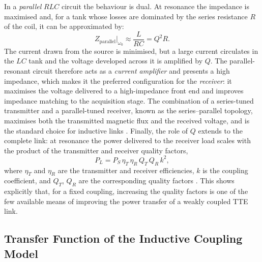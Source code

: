 In a \emph{parallel} $RLC$ circuit the behaviour is dual. At resonance the
impedance is maximised and, for a tank whose losses are dominated by the series
resistance $R$ of the coil, it can be approximated by:
\begin{equation}
    Z_{\text{parallel}}\big|_{\omega_0} \approx \frac{L}{RC} = Q^2 R.
    \label{eq:z_parallel_res}
\end{equation}
The current drawn from the source is minimised, but a large current circulates in
the $LC$ tank and the voltage developed across it is amplified by $Q$. The
parallel-resonant circuit therefore acts as a \emph{current amplifier} and
presents a high impedance, which makes it the preferred configuration for the
\emph{receiver}: it maximises the voltage delivered to a high-impedance front end
and improves impedance matching to the acquisition stage.
\newp
The combination of a series-tuned transmitter and a parallel-tuned receiver, known
as the series--parallel topology, maximises both the transmitted magnetic flux and
the received voltage, and is the standard choice for inductive
links \cite{agbinya2022principles}. Finally, the role of $Q$ extends to the complete link:
at resonance the power delivered to the receiver load scales with the product of
the transmitter and receiver quality factors,
\begin{equation}
    P_L = P_S\,\eta_T\,\eta_R\,Q_T\,Q_R\,k^2,
    \label{eq:power_q}
\end{equation}
where $\eta_T$ and $\eta_R$ are the transmitter and receiver efficiencies, $k$ is
the coupling coefficient, and $Q_T$, $Q_R$ are the corresponding quality
factors \cite{agbinya2012power}. This shows explicitly that, for a fixed coupling,
increasing the quality factors is one of the few available means of improving the
power transfer of a weakly coupled TTE link.

\subsection{Transfer Function of the Inductive Coupling Model}
\label{sec:transfer_function}

